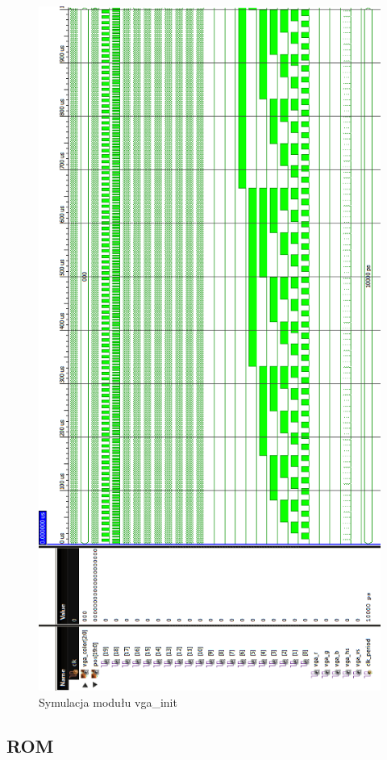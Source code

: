 \documentclass[11pt]{article}
\begin{document}
\begin{figure}[H]
\center
\includegraphics[scale=.5]{symulacja_vga.png} 
\caption{Symulacja modułu vga\_init}
\end{figure}

\subsection{ROM}
\end{document}
